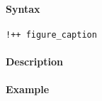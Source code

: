 


	\paragraph{Syntax}\label{syntax}

\begin{verbatim}
!++ figure_caption
\end{verbatim}

\paragraph{Description}\label{description}

\paragraph{Example}\label{example}



